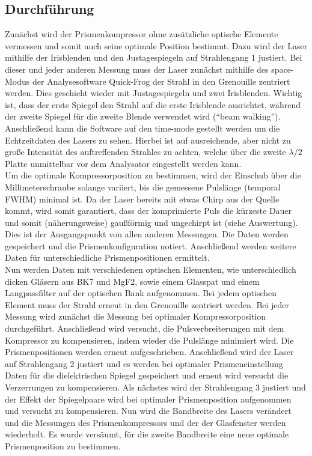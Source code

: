 \documentclass[twoside,        %
               BCOR12mm,       %
               english,ngerman, %
               fleqn,headsepline=false,footsepline=false
              ]{Vorlage/MFPREPORT}
\begin{document}
\subsection{Durchführung}
Zunächst wird der Prismenkompressor ohne zusätzliche optische Elemente
vermessen und somit auch seine optimale Position bestimmt. Dazu wird der Laser mithilfe der Irisblenden und den Justagespiegeln
auf Strahlengang 1 justiert. Bei dieser und jeder anderen Messung muss der
Laser zunächst mithilfe des space-Modus der Analysesoftware Quick-Frog der Strahl in den
Grenouille zentriert werden. Dies geschieht wieder mit Justagespiegeln und zwei
Irisblenden. Wichtig ist, dass der erste Spiegel den Strahl auf die erste
Irisblende ausrichtet, während der zweite Spiegel für die zweite Blende
verwendet wird (``beam walking''). Anschließend kann die Software auf den
time-mode gestellt werden um die Echtzeitdaten des Lasers zu sehen. Hierbei ist
auf ausreichende, aber nicht zu große Intensität des auftreffenden Strahles zu
achten, welche über die zweite $\lambda/2$ Platte unmittelbar vor dem Analysator
eingestellt werden kann.\\
Um die optimale Kompressorposition zu bestimmen, wird der Einschub über die
Millimeterschraube solange variiert, bis die gemessene Pulslänge (temporal
FWHM) minimal ist. Da der Laser bereits mit etwas Chirp aus der Quelle kommt,
wird somit garantiert, dass der komprimierte Puls die kürzeste Dauer und somit
(näherungsweise) gaußförmig und ungechirpt ist (siehe Auswertung). Dies ist der
Ausgangspunkt von allen anderen Messungen. Die Daten
werden gespeichert und die Prismenkonfiguration notiert. Anschließend werden
weitere Daten für unterschiedliche Prismenpositionen ermittelt.\\
Nun werden Daten mit
verschiedenen optischen Elementen, wie unterschiedlich dicken Gläsern aus BK7 und
MgF2, sowie einem Glasspat und einem Langpassfilter auf der optischen Bank
aufgenommen. Bei jedem optischen Element muss der Strahl erneut in den
Grenouille zentriert werden. Bei jeder Messung wird zunächst die Messung bei
optimaler Kompressorposition durchgeführt. Anschließend wird versucht, die
Pulsverbreiterungen mit dem Kompressor zu kompensieren, indem wieder die
Pulslänge minimiert wird. Die Prismenpositionen werden erneut aufgeschrieben.
Anschließend wird der Laser auf Strahlengang 2 justiert und es werden bei
optimaler Prismeneinstellung Daten für die dielektrischen Spiegel gespeichert
und erneut wird versucht die Verzerrungen zu kompensieren.
Als nächstes wird der Strahlengang 3 justiert und der Effekt der Spiegelpaare
wird bei optimaler Prismenposition aufgenommen und versucht zu kompensieren.
Nun wird die Bandbreite des Lasers verändert und die Messungen des
Prismenkompressors und der der Glasfenster werden wiederholt.
Es wurde versäumt, für die zweite Bandbreite eine neue optimale Prismenposition
zu bestimmen.
\end{document}
